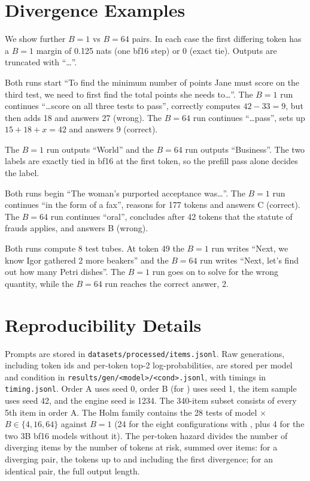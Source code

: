 \section{Divergence Examples}
\label{app:examples}

We show further $B=1$ vs $B=64$ pairs. In each case the first differing token has a $B=1$ margin of 0.125 nats (one bf16 step) or 0 (exact tie). Outputs are truncated with ``\ldots''.

 Both runs start ``To find the minimum number of points Jane must score on the third test, we need to first find the total points she needs to\ldots''. The $B=1$ run continues ``\ldots score on all three tests to pass'', correctly computes $42-33=9$, but then adds 18 and answers 27 (wrong). The $B=64$ run continues ``\ldots pass'', sets up $15+18+x=42$ and answers 9 (correct).

 The $B=1$ run outputs ``World'' and the $B=64$ run outputs ``Business''. The two labels are exactly tied in bf16 at the first token, so the prefill pass alone decides the label.

 Both runs begin ``The woman's purported acceptance was\ldots''. The $B=1$ run continues ``in the form of a fax'', reasons for 177 tokens and answers C (correct). The $B=64$ run continues ``oral'', concludes after 42 tokens that the statute of frauds applies, and answers B (wrong).

 Both runs compute 8 test tubes. At token 49 the $B=1$ run writes ``Next, we know Igor gathered 2 more beakers'' and the $B=64$ run writes ``Next, let's find out how many Petri dishes''. The $B=1$ run goes on to solve for the wrong quantity, while the $B=64$ run reaches the correct answer, 2.

\section{Reproducibility Details}
\label{app:repro}

Prompts are stored in \texttt{datasets/processed/items.jsonl}. Raw generations, including token ids and per-token top-2 log-probabilities, are stored per model and condition in \texttt{results/gen/<model>/<cond>.jsonl}, with timings in \texttt{timing.jsonl}. Order A uses seed 0, order B (for \bshuf) uses seed 1, the item sample uses seed 42, and the engine seed is 1234. The 340-item subset consists of every 5th item in order A. The Holm family contains the 28 tests of model $\times$ $B\in\{4,16,64\}$ against $B=1$ (24 for the eight configurations with , plus 4 for the two 3B bf16 models without it). The per-token hazard divides the number of diverging items by the number of tokens at risk, summed over items: for a diverging pair, the tokens up to and including the first divergence; for an identical pair, the full output length.
